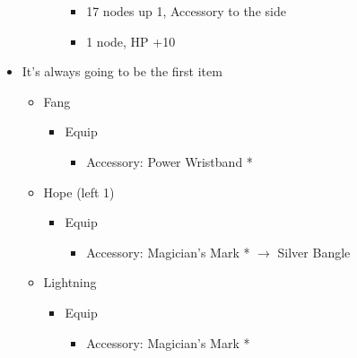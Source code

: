 \documentclass{report}
\begin{document}
\begin{menu}
\begin{itemize}
\begin{itemize}
\begin{itemize}
\begin{itemize}
                \item 17 nodes up 1, Accessory to the side
                \item 1 node, HP +10
            \end{itemize}
        \end{itemize}
    \end{itemize}
    \equip
    \item It's always going to be the first item
    \begin{itemize}
        \item Fang
        \begin{itemize}
            \item Equip
            \begin{itemize}
                \item Accessory: Power Wristband *
            \end{itemize}
        \end{itemize}
        \item Hope (left 1)
        \begin{itemize}
            \item Equip
            \begin{itemize}
                \item Accessory:  Magician's Mark * $\rightarrow$ Silver Bangle
            \end{itemize}
        \end{itemize}
        \item Lightning
        \begin{itemize}
            \item Equip
            \begin{itemize}
                \item Accessory: Magician's Mark *
            \end{itemize}
        \end{itemize}
    \end{itemize}
\end{itemize}
\end{menu}

\renewcommand{\first}{[1] Aggression (\com/\com/\rav)}
\renewcommand{\second}{[2] Relentless Assault (\com/\rav/\rav)}
\renewcommand{\third}{[3] Smart Bomb (\sab/\rav/\rav)}
\renewcommand{\fourth}{[4] Mystic Tower (\sen/\rav/\rav)}
\renewcommand{\fifth}{[5] Geurilla (\sab/\rav/\syn)}
\renewcommand{\sixth}{[6] Relentless Assault (\com/\rav/\rav)}
\end{document}
